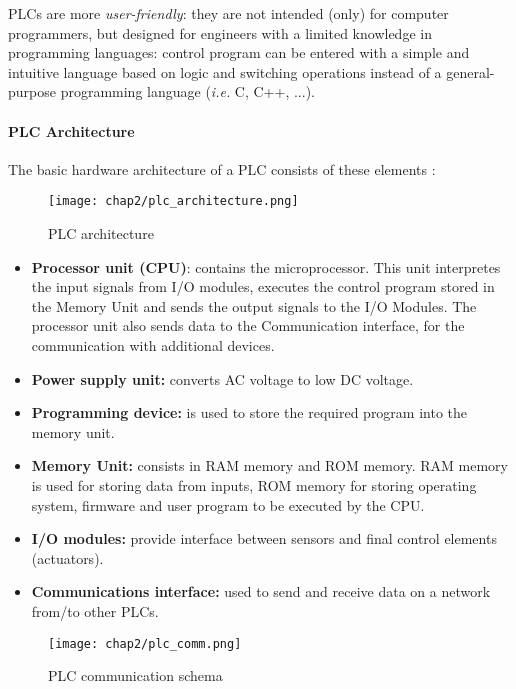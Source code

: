 \bigskip
PLCs are more \textit{user-friendly}: they are not intended (only) for computer programmers, but designed for engineers with a limited knowledge in programming languages: control program can be entered with a simple and intuitive language based on logic and switching operations instead of a general-purpose programming language (\textit{i.e.} C, C++, ...). 

\paragraph{PLC Architecture}
The basic hardware architecture of a PLC consists of these elements \cite{plc_book}:

\begin{figure}[ht]
	\centering
	\texttt{[image: chap2/plc\_architecture.png]}
	\caption{PLC architecture}
	\label{fig:PLC_architecture}
\end{figure}

\begin{itemize}
	\item \textbf{Processor unit (CPU)}: contains the microprocessor. This unit interpretes the input signals from I/O modules, executes the control program stored in the Memory Unit and sends the output signals to the I/O Modules.
	The processor unit also sends data to the Communication interface, for the communication with additional devices.
	\item \textbf{Power supply unit:} converts AC voltage to low DC voltage.
	\item \textbf{Programming device:} is used to store the required program into the memory unit.
	\item \textbf{Memory Unit:} consists in RAM memory and ROM memory. RAM memory is used for storing data from inputs, ROM memory for storing operating system, firmware and user program to be executed by the CPU.
	\item \textbf{I/O modules:} provide interface between sensors and final control elements (actuators).
	\item \textbf{Communications interface:} used to send and receive data on a network from/to other PLCs.
\end{itemize}

\begin{figure}[ht]
	\centering
	\texttt{[image: chap2/plc\_comm.png]}
	\caption{PLC communication schema}
	\label{fig:PLC_comm}
\end{figure}

